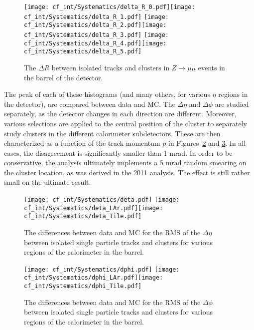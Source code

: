 \begin{figure}[h!]
\begin{center}
\texttt{[image: cf\_int/Systematics/delta\_R\_0.pdf]}\texttt{[image: cf\_int/Systematics/delta\_R\_1.pdf]}
\texttt{[image: cf\_int/Systematics/delta\_R\_2.pdf]}\texttt{[image: cf\_int/Systematics/delta\_R\_3.pdf]}
\texttt{[image: cf\_int/Systematics/delta\_R\_4.pdf]}\texttt{[image: cf\_int/Systematics/delta\_R\_5.pdf]}
\end{center}
\caption{The $\Delta R$ between isolated tracks and clusters in $Z\rightarrow\mu\mu$ events in the barrel of the detector.}
\label{fig:color:uncertainties:clusters:deltar}
\end{figure}

	The peak of each of these histograms (and many others, for various $\eta$ regions in the detector), are compared between data and MC. The $\Delta \eta$ and $\Delta \phi$ are studied separately, as the detector changes in each direction are different. Moreover, various selections are applied to the central position of the cluster to separately study clusters in the different calorimeter subdetectors. These are then characterized as a function of the track momentum $p$ in Figures~\ref{fig:color:uncertainties:clusters:deta} and \ref{fig:color:uncertainties:clusters:dphi}. In all cases, the disagreement is significantly smaller than 1 mrad. In order to be conservative, the analysis ultimately implements a 5 mrad random smearing on the cluster location, as was derived in the 2011 analysis. The effect is still rather small on the ultimate result.

\begin{figure}[h!]
\begin{center}
\texttt{[image: cf\_int/Systematics/deta.pdf]}
\texttt{[image: cf\_int/Systematics/deta\_LAr.pdf]}\texttt{[image: cf\_int/Systematics/deta\_Tile.pdf]}
\end{center}
\caption{The differences between data and MC for the RMS of the $\Delta \eta$ between isolated single particle tracks and clusters for various regions of the calorimeter in the barrel.}
\label{fig:color:uncertainties:clusters:deta}
\end{figure}

\begin{figure}[h!]
\begin{center}
\texttt{[image: cf\_int/Systematics/dphi.pdf]}
\texttt{[image: cf\_int/Systematics/dphi\_LAr.pdf]}\texttt{[image: cf\_int/Systematics/dphi\_Tile.pdf]}
\end{center}
\caption{The differences between data and MC for the RMS of the $\Delta \phi$ between isolated single particle tracks and clusters for various regions of the calorimeter in the barrel.}
\label{fig:color:uncertainties:clusters:dphi}
\end{figure}

